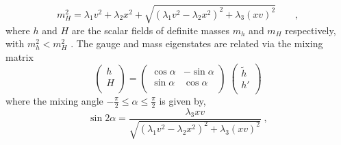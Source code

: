 \begin{equation}
 m_H^2=  \lambda_1 v^2 + \lambda_2 x^2 +\sqrt{(\lambda_1 v^2 - \lambda_2 x^2)^2 +\lambda_3 (xv)^2 } \qquad,  \end{equation}
\newline
where $h$ and $H$ are the scalar fields of definite masses $m_h$ and $m_H$ respectively, with $m_h^2 < m_H^2$ .
The gauge and mass eigenstates are related via the mixing matrix
\newline
$$
\left(
\begin{array}{c}
h   \\
H \\
\end{array}
\right)
=
\left(
\begin{array}{cc}
\cos \alpha & -\sin \alpha   \\
\sin \alpha & \cos \alpha \\
\end{array}
\right)
\;
\left(
\begin{array}{c}
\tilde{h}   \\
h' \\
\end{array}
\right)
$$
\newline
where the mixing angle $ - \frac{\pi}{2} \leq \alpha \leq  \frac{\pi}{2} $ is given by,
\newline
\begin{equation}
\sin 2 \alpha= \frac{\lambda_3 xv}{\sqrt{(\lambda_1 v^2 - \lambda_2 x^2)^2 +\lambda_3 (xv)^2 } } \; , \end{equation}

